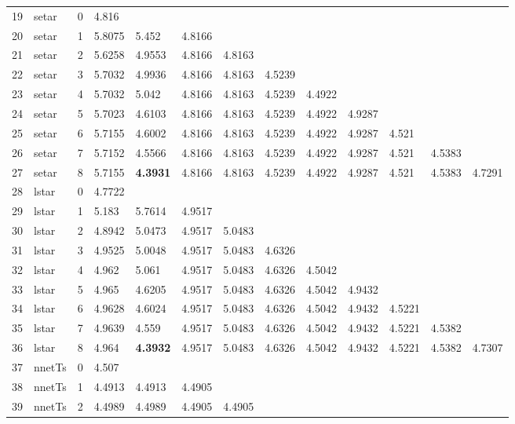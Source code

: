 \documentclass[10pt,a4paper]{article}
\begin{document}
\begin{table}[ht]
\begin{tabular}{rlrllllllllll}
   \hline
19 & setar &     0 & 4.816 &  &  &  &  &  &  &  &  &  \\ 
  20 & setar &     1 & 5.8075 & 5.452 & 4.8166 &  &  &  &  &  &  &  \\ 
  21 & setar &     2 & 5.6258 & 4.9553 & 4.8166 & 4.8163 &  &  &  &  &  &  \\ 
  22 & setar &     3 & 5.7032 & 4.9936 & 4.8166 & 4.8163 & 4.5239 &  &  &  &  &  \\ 
  23 & setar &     4 & 5.7032 & 5.042 & 4.8166 & 4.8163 & 4.5239 & 4.4922 &  &  &  &  \\ 
  24 & setar &     5 & 5.7023 & 4.6103 & 4.8166 & 4.8163 & 4.5239 & 4.4922 & 4.9287 &  &  &  \\ 
  25 & setar &     6 & 5.7155 & 4.6002 & 4.8166 & 4.8163 & 4.5239 & 4.4922 & 4.9287 & 4.521 &  &  \\ 
  26 & setar &     7 & 5.7152 & 4.5566 & 4.8166 & 4.8163 & 4.5239 & 4.4922 & 4.9287 & 4.521 & 4.5383 &  \\ 
  27 & setar &     8 & 5.7155 & \textbf{4.3931} & 4.8166 & 4.8163 & 4.5239 & 4.4922 & 4.9287 & 4.521 & 4.5383 & 4.7291 \\ 
   \hline
28 & lstar &     0 & 4.7722 &  &  &  &  &  &  &  &  &  \\ 
  29 & lstar &     1 & 5.183 & 5.7614 & 4.9517 &  &  &  &  &  &  &  \\ 
  30 & lstar &     2 & 4.8942 & 5.0473 & 4.9517 & 5.0483 &  &  &  &  &  &  \\ 
  31 & lstar &     3 & 4.9525 & 5.0048 & 4.9517 & 5.0483 & 4.6326 &  &  &  &  &  \\ 
  32 & lstar &     4 & 4.962 & 5.061 & 4.9517 & 5.0483 & 4.6326 & 4.5042 &  &  &  &  \\ 
  33 & lstar &     5 & 4.965 & 4.6205 & 4.9517 & 5.0483 & 4.6326 & 4.5042 & 4.9432 &  &  &  \\ 
  34 & lstar &     6 & 4.9628 & 4.6024 & 4.9517 & 5.0483 & 4.6326 & 4.5042 & 4.9432 & 4.5221 &  &  \\ 
  35 & lstar &     7 & 4.9639 & 4.559 & 4.9517 & 5.0483 & 4.6326 & 4.5042 & 4.9432 & 4.5221 & 4.5382 &  \\ 
  36 & lstar &     8 & 4.964 & \textbf{4.3932} & 4.9517 & 5.0483 & 4.6326 & 4.5042 & 4.9432 & 4.5221 & 4.5382 & 4.7307 \\ 
   \hline
37 & nnetTs &     0 & 4.507 &  &  &  &  &  &  &  &  &  \\ 
  38 & nnetTs &     1 & 4.4913 & 4.4913 & 4.4905 &  &  &  &  &  &  &  \\ 
  39 & nnetTs &     2 & 4.4989 & 4.4989 & 4.4905 & 4.4905 &  &  &  &  &  &  \\ 

\end{tabular}
\end{table}
\end{document}
